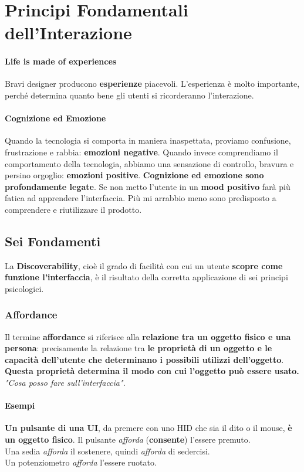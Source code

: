 \documentclass[10pt]{article}
\begin{document}
\section{Principi Fondamentali dell'Interazione}
\paragraph{Life is made of experiences} Bravi designer producono \textbf{esperienze} piacevoli. L'esperienza è molto importante, perché determina quanto bene gli utenti si ricorderanno l'interazione.
\paragraph{Cognizione ed Emozione} Quando la tecnologia si comporta in maniera inaspettata, proviamo confusione, frustrazione e rabbia: \textbf{emozioni negative}. Quando invece comprendiamo il comportamento della tecnologia, abbiamo una sensazione di controllo, bravura e persino orgoglio: \textbf{emozioni positive}. \textbf{Cognizione ed emozione sono profondamente legate}. Se non metto l'utente in un \textbf{mood positivo} farà più fatica ad apprendere l'interfaccia. Più mi arrabbio meno sono predisposto a comprendere e riutilizzare il prodotto.
\subsection{Sei Fondamenti} La \textbf{Discoverability}, cioè il grado di facilità con cui un utente \textbf{scopre come funzione l'interfaccia}, è il risultato della corretta applicazione di sei principi psicologici.
\subsubsection{Affordance}
Il termine \textbf{affordance} si riferisce alla \textbf{relazione tra un oggetto fisico e una persona}: precisamente la relazione tra \textbf{le proprietà di un oggetto e le capacità dell'utente che determinano i possibili utilizzi dell'oggetto}.\\
\textbf{Questa proprietà determina il modo con cui l'oggetto può essere usato.}\\
\emph{"Cosa posso fare sull'interfaccia"}.
\paragraph{Esempi} \textbf{Un pulsante di una UI}, da premere con uno HID che sia il dito o il mouse, \textbf{è un oggetto fisico}. Il pulsante \textit{afforda} (\textbf{consente}) l'essere premuto.\\
Una sedia \textit{afforda} il sostenere, quindi \textit{afforda} di sedercisi.\\
Un potenziometro \textit{afforda} l'essere ruotato.
\end{document}
